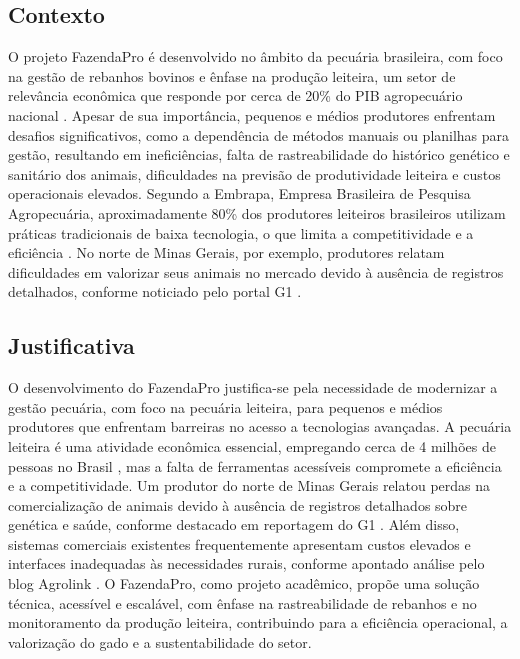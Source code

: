 \documentclass[12pt, a4paper]{article}
\begin{document}
\subsection{Contexto}
\begin{spacing}{1.5}
O projeto FazendaPro é desenvolvido no âmbito da pecuária brasileira, com foco na gestão de rebanhos bovinos e ênfase na produção leiteira, um setor de relevância econômica que responde por cerca de 20\% do PIB agropecuário nacional \cite{agro20}. Apesar de sua importância, pequenos e médios produtores enfrentam desafios significativos, como a dependência de métodos manuais ou planilhas para gestão, resultando em ineficiências, falta de rastreabilidade do histórico genético e sanitário dos animais, dificuldades na previsão de produtividade leiteira e custos operacionais elevados. Segundo a Embrapa, Empresa Brasileira de Pesquisa Agropecuária,  aproximadamente 80\% dos produtores leiteiros brasileiros utilizam práticas tradicionais de baixa tecnologia, o que limita a competitividade e a eficiência \cite{anuario2023}. No norte de Minas Gerais, por exemplo, produtores relatam dificuldades em valorizar seus animais no mercado devido à ausência de registros detalhados, conforme noticiado pelo portal G1 \cite{g12022}.
\end{spacing}

\subsection{Justificativa}
\begin{spacing}{1.5}
O desenvolvimento do FazendaPro justifica-se pela necessidade de modernizar a gestão pecuária, com foco na pecuária leiteira, para pequenos e médios produtores que enfrentam barreiras no acesso a tecnologias avançadas. A pecuária leiteira é uma atividade econômica essencial, empregando cerca de 4 milhões de pessoas no Brasil \cite{4milhao}, mas a falta de ferramentas acessíveis compromete a eficiência e a competitividade. Um produtor do norte de Minas Gerais relatou perdas na comercialização de animais devido à ausência de registros detalhados sobre genética e saúde, conforme destacado em reportagem do G1 \cite{g12022}. Além disso, sistemas comerciais existentes frequentemente apresentam custos elevados e interfaces inadequadas às necessidades rurais, conforme apontado análise pelo blog Agrolink \cite{agropec2024}. O FazendaPro, como projeto acadêmico, propõe uma solução técnica, acessível e escalável, com ênfase na rastreabilidade de rebanhos e no monitoramento da produção leiteira, contribuindo para a eficiência operacional, a valorização do gado e a sustentabilidade do setor.
\end{spacing}
\end{document}
